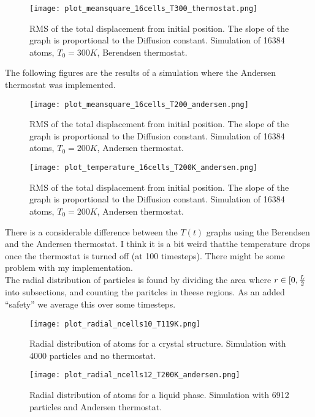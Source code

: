 \documentclass[a4paper,english, 10pt, twoside]{article}
\begin{document}
\begin{figure}[H]
\centering
\texttt{[image: plot\_meansquare\_16cells\_T300\_thermostat.png]}
\caption{RMS of the total displacement from initial position. The slope of the graph 
is proportional to the Diffusion constant. Simulation of 16384 atoms, $T_0=300K$, Berendsen thermostat.}
\label{displacement_300K_berendsen}
\end{figure}
The following figures are the results of a simulation where the Andersen thermostat was implemented.

\begin{figure}[H]
\centering
\texttt{[image: plot\_meansquare\_16cells\_T200\_andersen.png]}
\caption{RMS of the total displacement from initial position. The slope of the graph 
is proportional to the Diffusion constant. Simulation of 16384 atoms, $T_0=200K$, Andersen thermostat.}
\label{displacement_300K_andersen}
\end{figure}

\begin{figure}[H]
\centering
\texttt{[image: plot\_temperature\_16cells\_T200K\_andersen.png]}
\caption{RMS of the total displacement from initial position. The slope of the graph 
is proportional to the Diffusion constant. Simulation of 16384 atoms, $T_0=200K$, Andersen thermostat.}
\label{temperature_200K_andersen}
\end{figure}
There is a considerable difference between the $T(t)$ graphs using the Berendsen and the Andersen thermostat. 
I think it is a bit weird thatthe temperature drops once the thermostat is turned off (at 100 timesteps). 
There might be some problem with my implementation.\\

The radial distribution of particles is found by dividing the area where $r\in[0,{L\over2}$ into subsections, 
and counting the paritcles in theese regions. As an added ``safety'' we average this over some timesteps.

\begin{figure}[H]
\centering
 \texttt{[image: plot\_radial\_ncells10\_T119K.png]}
 \caption{Radial distribution of atoms for a crystal structure. Simulation with 4000 particles and no thermostat.}
 \label{radial_10cells}
\end{figure}

\begin{figure}[H]
\centering
 \texttt{[image: plot\_radial\_ncells12\_T200K\_andersen.png]}
 \caption{Radial distribution of atoms for a liquid phase. Simulation with 6912 particles and Andersen thermostat.}
 \label{radial_12cells}
\end{figure}
\end{document}
